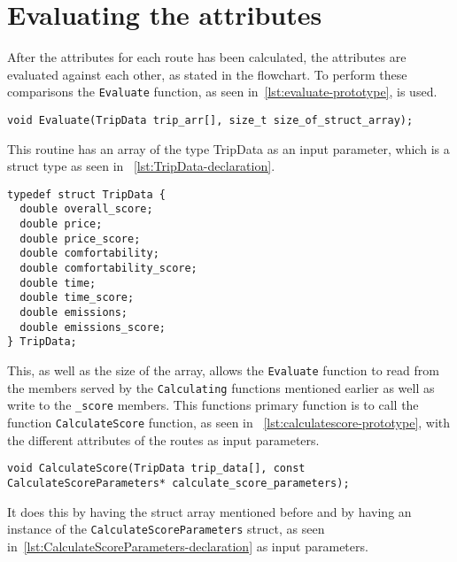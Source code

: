 \section{Evaluating the attributes}\label{sec:evaluating-the-attributes}

After the attributes for each route has been calculated, the attributes are evaluated against each other, as stated in
the flowchart.
To perform these comparisons the \texttt{Evaluate} function, as seen in~\ref{lst:evaluate-prototype}, is used.

\begin{lstlisting}[caption={Function prototype for \texttt{Evaluate}}, label={lst:evaluate-prototype}]
void Evaluate(TripData trip_arr[], size_t size_of_struct_array);
\end{lstlisting}

This routine has an array of the type TripData as an input parameter, which is a struct type as seen in
~\ref{lst:TripData-declaration}.

\begin{lstlisting}[caption={Declaration of \texttt{TripData} struct}, label={lst:TripData-declaration}]
typedef struct TripData {
  double overall_score;
  double price;
  double price_score;
  double comfortability;
  double comfortability_score;
  double time;
  double time_score;
  double emissions;
  double emissions_score;
} TripData;
\end{lstlisting}

This, as well as the size of the array, allows the \texttt{Evaluate} function to read from the members served by the
\texttt{Calculating} functions mentioned earlier as well as write to the \texttt{\_score} members.
This functions primary function is to call the function \texttt{CalculateScore} function, as seen in
~\ref{lst:calculatescore-prototype}, with the different attributes of the routes as input parameters.

\begin{lstlisting}[caption={Function prototype for \texttt{CalculateScore}}, label={lst:calculatescore-prototype}]
void CalculateScore(TripData trip_data[], const CalculateScoreParameters* calculate_score_parameters);
\end{lstlisting}

It does this by having the struct array mentioned before and by having an instance of the
\texttt{CalculateScoreParameters} struct, as seen in~\ref{lst:CalculateScoreParameters-declaration} as input parameters.

